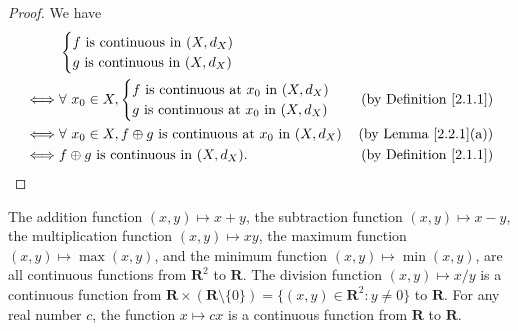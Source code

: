 \begin{proof}
    We have
    \begin{align*}
             & \begin{cases}
            f \text{ is continuous in } (X, d_X) \\
            g \text{ is continuous in } (X, d_X)
        \end{cases}                                                                                              \\
        \iff & \forall\ x_0 \in X, \begin{cases}
            f \text{ is continuous at } x_0 \text{ in } (X, d_X) \\
            g \text{ is continuous at } x_0 \text{ in } (X, d_X)
        \end{cases}                                     & \text{(by Definition \ref{2.1.1})} \\
        \iff & \forall\ x_0 \in X, f \oplus g \text{ is continuous at } x_0 \text{ in } (X, d_X) & \text{(by Lemma \ref{2.2.1}(a))}   \\
        \iff & f \oplus g \text{ is continuous in } (X, d_X).                                    & \text{(by Definition \ref{2.1.1})}
    \end{align*}
\end{proof}

\begin{lemma}\label{2.2.2}
    The addition function \((x, y) \mapsto x + y\), the subtraction function \((x, y) \mapsto x - y\), the multiplication function \((x, y) \mapsto xy\), the maximum function \((x, y) \mapsto \max(x, y)\), and the minimum function \((x, y) \mapsto \min(x, y)\), are all continuous functions from \(\mathbf{R}^2\) to \(\mathbf{R}\).
    The division function \((x, y) \mapsto x / y\) is a continuous function from \(\mathbf{R} \times (\mathbf{R} \setminus \{0\}) = \{(x, y) \in \mathbf{R}^2 : y \neq 0\}\) to \(\mathbf{R}\).
    For any real number \(c\), the function \(x \mapsto cx\) is a continuous function from \(\mathbf{R}\) to \(\mathbf{R}\).
\end{lemma}

